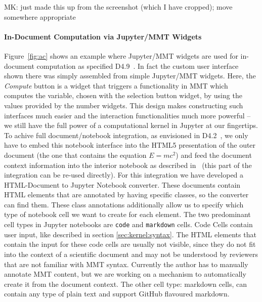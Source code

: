 

\begin{newpart}{MK: just made this up from the screenshot (which I have cropped); move somewhere appropriate}
  \paragraph{In-Document Computation via Jupyter/MMT Widgets}
  Figure~\ref{fig:ac} shows an example where Jupyter/MMT widgets are used for in-document computation as specified D4.9~\cite{ODK-D4.9}.
  In fact the custom user interface shown there was simply assembled from simple Jupyter/MMT widgets. Here, the \textit{Compute} button is a widget that triggers a functionality in MMT which computes the variable, chosen with the selection button widget, by using the values provided by the number widgets.
  This design makes constructing such interfaces much easier and the interaction functionalities much more powerful -- we still have the full power of a computational kernel in Jupyter at our fingertips. 
  To achive full document/notebook integration, as envisioned in D4.2~\cite{ODK-D4.2}, we only have to embed this notebook interface into the HTML5 presentation of the outer document (the one that contains the equation $E=mc^2$) and feed the document context information into the interior notebook as described in~\cite{ODK-D4.9} (this part of the integration can be re-used directly).
For this integration we have developed a HTML-Document to Jupyter Notebook converter. These documents contain HTML elements that are annotated by having specific classes, so the converter can find them. 
These class annotations additionally allow us to specify which type of notebook cell we want to create for each element. 
The two predominant cell types in Jupyter notebooks are \texttt{code} and \texttt{markdown} cells. 
Code Cells contain user input, like described in section \ref{sec:kernel:syntax}. The HTML elements that contain the input for these code cells are usually not visible, since they do not fit into the context of a scientific document and may not be understood by reviewers that are not familiar with MMT syntax. 
Currently the author has to manually annotate MMT content, but we are working on a mechanism to automatically create it from the document context. The other cell type: markdown cells, can contain any type of plain text and support GitHub flavoured markdown. 

\end{newpart}
